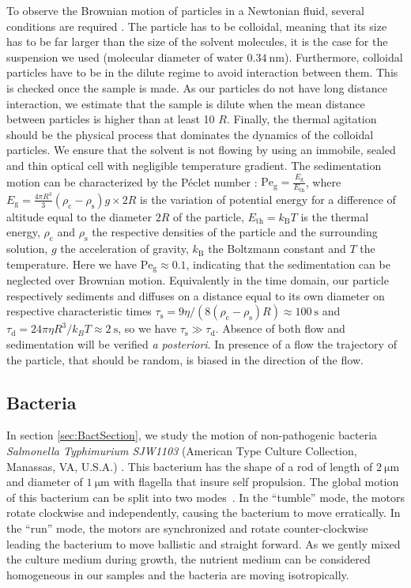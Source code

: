 \documentclass[prb,twocolumn,amsmath,amssymb]{revtex4-1}
\begin{document}
To observe the Brownian motion of particles in a Newtonian fluid, several conditions are required \citep{16_CollSusp}. The particle has to be colloidal, meaning that its size has to be far larger than the size of the solvent molecules, it is the case for the suspension we used (molecular diameter of water \citep{17_marcus1998properties}  $\SI{0.34}{\nano\meter}$). Furthermore, colloidal particles have to be in the dilute regime to avoid interaction between them. This is checked once the sample is made. As our particles do not have long distance interaction, we estimate that the sample is dilute when the mean distance between particles is higher than at least 10 $R$. Finally, the thermal agitation should be the physical process that dominates the dynamics of the colloidal particles. We ensure that the solvent is not flowing by using an immobile, sealed and thin optical cell with negligible temperature gradient. The sedimentation motion can be characterized by the P\'eclet number \citep{12_patankar1980numerical, ajp2009saka}: $\text{Pe}_\text{g} = \frac{E_\text{g}}{E_\text{th}}$, where $E_\text{g} = \frac{4 \pi R^3}{3}  (\rho_\text{c} - \rho_\text{s}) g  \times 2R$ is the variation of potential energy for a difference of altitude equal to the diameter $2R$ of the particle, $E_\text{th} = k_\text{B} T$ is the thermal energy, $\rho_\text{c}$ and $\rho_\text{s}$ the respective densities of the particle and the surrounding solution, $g$ the acceleration of gravity, $k_\text{B}$ the Boltzmann constant and $T$ the temperature. Here we have $\text{Pe}_\text{g} \approx 0.1$, indicating that the sedimentation can be neglected over Brownian motion. Equivalently in the time domain, our particle respectively sediments and diffuses on a distance equal to its own diameter on respective characteristic times $\tau_\text{s}=9\eta/(8(\rho_\text{c}-\rho_\text{s}) R)\approx\SI{100}{\second}$ and $\tau_\text{d}=24\pi\eta R^3/k_BT\approx\SI{2}{\second}$, so we have $\tau_\text{s}\gg\tau_\text{d}$. Absence of both flow and sedimentation will be verified \textit{a posteriori}. In presence of a flow the trajectory of the particle, that should be random, is biased in the direction of the flow.

\subsection{Bacteria}
In section \ref{sec:BactSection}, we study the motion of non-pathogenic bacteria \textit{Salmonella Typhimurium SJW1103}  (American Type Culture Collection, Manassas, VA, U.S.A.) \citep{21_fabrega2013salmonella}. This bacterium has the shape of a rod of length of $\SI{2}{\micro\meter}$ and diameter of $\SI{1}{\micro\meter}$ with flagella that insure self propulsion\citep{5_berg2000motile}. The global motion of this bacterium can be split into two modes~\cite{Nelson2004}. In the ``tumble'' mode, the motors rotate clockwise and independently, causing the bacterium to move erratically. In the ``run'' mode, the motors are synchronized and rotate counter-clockwise leading the bacterium to move ballistic and straight forward. As we gently mixed the culture medium during growth, the nutrient medium can be considered homogeneous in our samples and the bacteria are moving isotropically.
\end{document}
